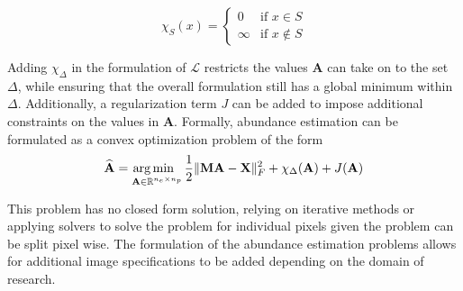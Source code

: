 \begin{equation}
    \label{ae:indfunc}
    \chi_{S}(x) = 
            \begin{cases}
            0 &\text{if } x \in S \\
            \infty &\text{if } x \not \in S 
            \end{cases}
\end{equation}

Adding $\chi_\Delta$ in the formulation of $\mathcal{L}$ restricts the values $\mathbf{A}$ can take on to the set $\Delta$, while ensuring that the overall formulation still has a global minimum within $\Delta$. Additionally, a regularization term $J$ can be added to impose additional constraints on the values in $\mathbf{A}$. Formally, abundance estimation can be formulated as a convex optimization problem of the form 
\begin{equation}
    \label{ae:ae-min-1}
    \widehat{\mathbf{A}} = \operatorname*{arg\,min \;\;}_{\mathbf{A} \in \mathbb{R}^{n_e \times n_p}} \frac{1}{2}\|\mathbf{MA} - \mathbf{X}\|_F^2 + \chi_\Delta(\mathbf{A}) + J(\mathbf{A}) 
\end{equation}

This problem has no closed form solution, relying on iterative methods or applying solvers to solve the problem for individual pixels given the problem can be split pixel wise. The formulation of the abundance estimation problems allows for additional image specifications to be added depending on the domain of research. 